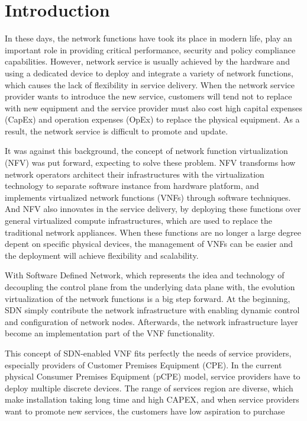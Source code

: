 \section{Introduction}
In these days, the network functions have took its place in modern life, play an important role in providing critical performance, security and policy compliance capabilities. However, network service is usually achieved by the hardware and using a dedicated device to deploy and integrate a variety of network functions, which causes the lack of flexibility in service delivery. When the network service provider wants to introduce the new service, customers will tend not to replace with new equipment and the service provider must also cost high capital expenses (CapEx) and operation expenses (OpEx) to replace the physical equipment. As a result, the network service is difficult to promote and update.

It was against this background, the concept of network function virtualization (NFV) was put forward, expecting to solve these problem. NFV transforms how network operators architect their infrastructures with the virtualization technology to separate software instance from hardware platform, and implements virtualized network functions (VNFs) through software techniques. And NFV also innovates in the service delivery, by deploying these functions over general virtualized compute infrastructures, which are used to replace the traditional network appliances. When these functions are no longer a large degree depent on specific physical devices, the management of VNFs can be easier and the deployment will achieve flexibility and scalability.

With Software Defined Network, which represents the idea and technology of decoupling the control plane from the underlying data plane with, the evolution virtualization of the network functions is a big step forward.  At the beginning, SDN simply contribute the network infrastructure with enabling dynamic control and configuration of network nodes. Afterwards, the network infrastructure layer become an implementation part of the VNF functionality.

This concept of SDN-enabled VNF fits perfectly the needs of service providers, especially providers of Customer Premises Equipment (CPE). In the current physical Consumer Premises Equipment (pCPE) model, service providers have to deploy multiple discrete devices. The range of services region are diverse, which make installation taking long time and high CAPEX, and when service providers want to promote new services, the customers have low aspiration to purchase

